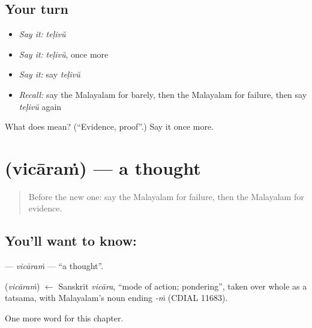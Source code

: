 \subsection*{Your turn}
\begin{itemize}
\raggedright
  \item \emph{Say it:} \emph{teḷivŭ}
  \item \emph{Say it:} \emph{teḷivŭ}, once more
  \item \emph{Say it:} say \emph{teḷivŭ}
  \item \emph{Recall:} say the Malayalam for barely, then the Malayalam for failure, then say \emph{teḷivŭ} again
\end{itemize}

\begin{tcolorbox}[breakable,colback=teal!4,colframe=teal!35!black,title={Before you move on}]
What does  mean? (\textquotedblleft{}Evidence, proof\textquotedblright{}.) Say it once more.
\end{tcolorbox}
\section[\texorpdfstring{\ml{വിചാരം} (vicāraṁ)}{വിചാരം (vicāraṁ)}]{ (vicāraṁ) — a thought}

\label{lesson:ML-C318-vicaram}



\begin{quote}
Before the new one: say the Malayalam for failure, then the Malayalam for evidence.
\end{quote}

\subsection*{You'll want to know: }
\textbf{} — \emph{vicāraṁ} — \textquotedblleft{}a thought\textquotedblright{}.

\begin{cousinweb}
\textbf{} (\emph{vicāraṁ}) $\leftarrow$ Sanskrit \emph{vicāra}, \textquotedblleft{}mode of action; pondering\textquotedblright{}, taken over whole as a tatsama, with Malayalam's noun ending \emph{-ṁ} (CDIAL 11683).
\end{cousinweb}

\begin{grammarlens}[title={What you've built}]
One more word for this chapter.
\end{grammarlens}


